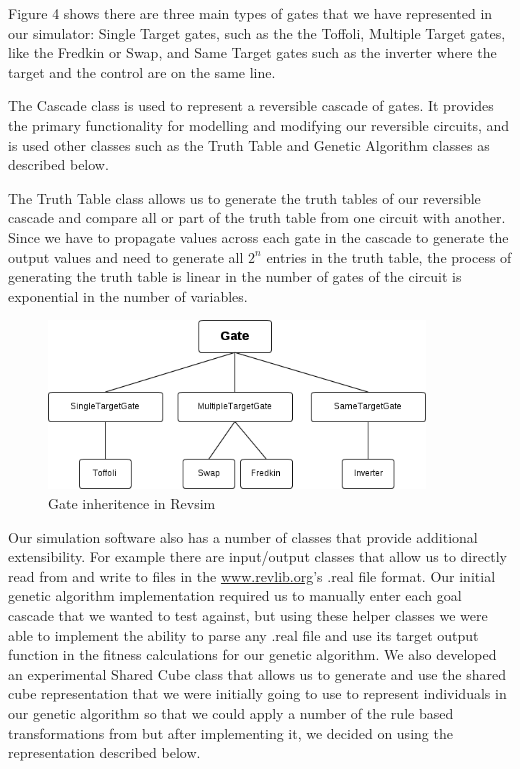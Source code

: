 Figure 4 shows there are three main types of gates that we have represented in our simulator: Single Target 
gates, such as the the Toffoli, Multiple Target gates, like the Fredkin or Swap, and Same Target gates such as the inverter 
where the target and the control are on the same line.

The Cascade class is used to represent a reversible cascade of gates. It provides the primary functionality for modelling 
and modifying our reversible circuits, and is used other classes such as the Truth Table and Genetic Algorithm classes as 
described below.

The Truth Table class allows us to generate the truth tables of our reversible cascade and compare all or part of the truth 
table from one circuit with another. Since we have to propagate values across each gate in the cascade to generate the output 
values and need to generate all \(2^{n}\) entries in the truth table, the process of generating the truth table is linear in the 
number of gates of the circuit is exponential in the number of variables.

\begin{figure}[ht!]
\centering
\includegraphics[width=100mm]{diagrams/gate_inheritence.png}
\caption{Gate inheritence in Revsim}
\end{figure}

Our simulation software also has a number of classes that provide additional extensibility. For example there are input/output 
classes that allow us to directly read from and write to files in the \url{www.revlib.org}'s .real file format. Our initial genetic algorithm implementation 
required us to manually enter each goal cascade that we wanted to test against, but using these helper classes we were able to 
implement the ability to parse any .real file and use its target output function in the fitness calculations for our genetic 
algorithm. We also developed an experimental Shared Cube class that allows us to generate and use the shared cube 
representation that we were initially going to use to represent individuals in our genetic algorithm so that we could apply a 
number of the rule based transformations from \cite{Nayeem2011} but after implementing it, we decided 
on using the representation described below. 

